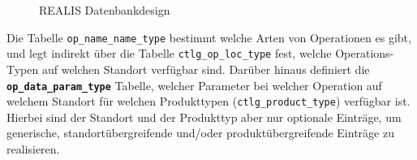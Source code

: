 \begin{figure}[!htbp]
    \centering
    \caption{REALIS Datenbankdesign}
    \label{fig:realis-datenbankdesign}
\end{figure}

Die Tabelle \texttt{op\_name\_name\_type} bestimmt welche Arten von Operationen es gibt, und legt indirekt über die Tabelle \texttt{ctlg\_op\_loc\_type} fest, welche Operations-Typen auf welchen Standort verfügbar sind. Darüber hinaus definiert die 
\textbf{\texttt{op\_data\_param\_\-type}} Tabelle, welcher Parameter bei welcher Operation auf welchem Standort für welchen Produkttypen (\texttt{ctlg\_product\_type}) verfügbar ist. Hierbei sind der Standort und der Produkttyp aber nur optionale Einträge, um generische, standortübergreifende und/oder produktübergreifende Einträge zu realisieren.

